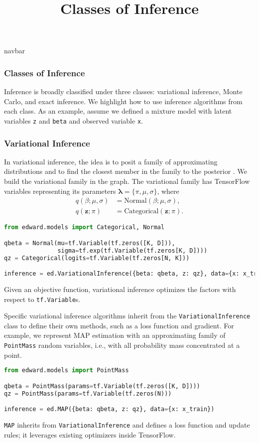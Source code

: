 \title{Classes of Inference}

{{navbar}}

\subsubsection{Classes of Inference}

Inference is broadly classified under three classes: variational
inference, Monte Carlo, and exact inference.
We highlight how to use inference algorithms from each class.
As an example, assume we defined a mixture model with latent variables
\texttt{z} and \texttt{beta} and observed variable \texttt{x}.

\subsubsection{Variational Inference}

In variational inference, the idea is to posit a family of approximating
distributions and to find the closest member in the family to the
posterior \citep{jordan1999introduction}.
We build the variational family in the graph.
The variational family has TensorFlow
variables representing its parameters $\mathbf{\lambda}=\{\pi,\mu,\sigma\}$,
where
\begin{align*}
q(\beta;\mu,\sigma) &= \text{Normal}(\beta; \mu,\sigma), \\[1.5ex]
q(\mathbf{z};\pi) &= \text{Categorical}(\mathbf{z};\pi).
\end{align*}
\begin{lstlisting}[language=Python]
from edward.models import Categorical, Normal

qbeta = Normal(mu=tf.Variable(tf.zeros([K, D])),
               sigma=tf.exp(tf.Variable(tf.zeros[K, D])))
qz = Categorical(logits=tf.Variable(tf.zeros[N, K]))

inference = ed.VariationalInference({beta: qbeta, z: qz}, data={x: x_train})
\end{lstlisting}
Given an objective function, variational inference optimizes the
factors with respect to \texttt{tf.Variable}s.

Specific variational inference algorithms inherit from
the \texttt{VariationalInference} class to define their own methods, such as a
loss function and gradient.
For example, we represent MAP estimation with
an approximating family of
\texttt{PointMass} random variables,
i.e., with all probability mass concentrated at a point.
\begin{lstlisting}[language=Python]
from edward.models import PointMass

qbeta = PointMass(params=tf.Variable(tf.zeros([K, D])))
qz = PointMass(params=tf.Variable(tf.zeros(N)))

inference = ed.MAP({beta: qbeta, z: qz}, data={x: x_train})
\end{lstlisting}
\texttt{MAP}
inherits from \texttt{VariationalInference} and defines a loss
function and update rules; it leverages existing optimizers inside TensorFlow.

